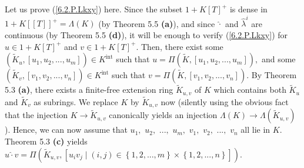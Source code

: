 \documentclass[12pt,final,notitlepage,onecolumn,german]{article}%
\begin{document}
Let us prove (\ref{6.2.P.Lkxy}) here. Since the subset $1+K\left[  T\right]
^{+}$ is dense in $1+K\left[  \left[  T\right]  \right]  ^{+}=\Lambda\left(
K\right)  $ (by Theorem 5.5 \textbf{(a)}), and since $\widehat{\cdot}$ and
$\widehat{\lambda}^{i}$ are continuous (by Theorem 5.5 \textbf{(d)}), it will
be enough to verify (\ref{6.2.P.Lkxy}) for $u\in1+K\left[  T\right]  ^{+}$ and
$v\in1+K\left[  T\right]  ^{+}$. Then, there exist some $\left(  \widetilde
{K}_{u},\left[  u_{1},u_{2},...,u_{m}\right]  \right)  \in
K^{\operatorname*{int}}$ such that $u=\Pi\left(  \widetilde{K},\left[
u_{1},u_{2},...,u_{m}\right]  \right)  ,$ and some $\left(  \widetilde{K}%
_{v},\left[  v_{1},v_{2},...,v_{n}\right]  \right)  \in K^{\operatorname*{int}%
}$ such that $v=\Pi\left(  \widetilde{K},\left[  v_{1},v_{2},...,v_{n}\right]
\right)  .$ By Theorem 5.3 \textbf{(a)}, there exists a finite-free extension
ring $\widetilde{K}_{u,v}$ of $K$ which contains both $\widetilde{K}_{u}$ and
$\widetilde{K}_{v}$ as subrings. We replace $K$ by $\widetilde{K}_{u,v}$ now
(silently using the obvious fact that the injection $K\rightarrow\widetilde
{K}_{u,v}$ canonically yields an injection $\Lambda\left(  K\right)
\rightarrow\Lambda\left(  \widetilde{K}_{u,v}\right)  $). Hence, we can now
assume that $u_{1},$ $u_{2},$ $...,$ $u_{m},$ $v_{1},$ $v_{2},$ $...,$ $v_{n}$
all lie in $K$. Theorem 5.3 \textbf{(c)} yields $u\widehat{\cdot}v=\Pi\left(
\widetilde{K}_{u,v},\left[  u_{i}v_{j}\mid\left(  i,j\right)  \in\left\{
1,2,...,m\right\}  \times\left\{  1,2,...,n\right\}  \right]  \right)  $.
\end{document}
